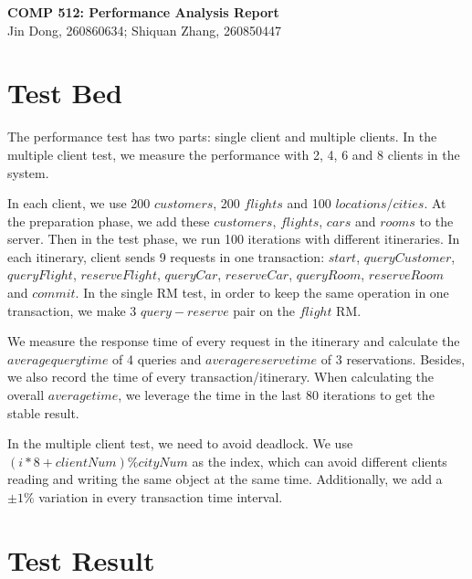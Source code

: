 \documentclass[a4paper, 11pt]{article}
\title{}
\author{Jin Dong}
\newcommand{\newAssignment}[2]{
	\begin{center}
  		\textbf{{\huge #1}}\vspace{5pt} \\
  		{\large #2}\vspace{5pt}
	\end{center}
}
\begin{document}
\newAssignment{COMP 512: Performance Analysis Report}{Jin Dong, 260860634; Shiquan Zhang, 260850447}


\vspace{-35pt}
\section{Test Bed}
\vspace{-15pt}
     The performance test has two parts: single client and multiple clients. In the multiple client test, we measure the performance with 2, 4, 6 and 8 clients in the system. \par
     In each client, we use 200 $customers$, 200 $flights$ and 100 $locations/cities$. At the preparation phase, we add these $customers$, $flights$, $cars$ and $rooms$ to the server. Then in the test phase, we run 100 iterations with different itineraries. In each itinerary, client sends 9 requests in one transaction: $start$, $queryCustomer$, $queryFlight$, $reserveFlight$, $queryCar$, $reserveCar$, $queryRoom$, $reserveRoom$ and $commit$. In the single RM test, in order to keep the same operation in one transaction, we make 3 $query-reserve$ pair on the $flight$ RM. \par
     We measure the response time of every request in the itinerary and calculate the $average query time$ of 4 queries and $average reserve time$ of 3 reservations. Besides, we also record the time of every transaction/itinerary. When calculating the overall $average time$, we leverage the time in the last 80 iterations to get the stable result. \par
     In the multiple client test, we need to avoid deadlock. We use $(i*8 + clientNum) \% cityNum$ as the index, which can avoid different clients reading and writing the same object at the same time. Additionally, we add a $\pm 1\%$ variation in every transaction time interval.
\vspace{-20pt}
\section{Test Result}
\vspace{-10pt}
\end{document}
